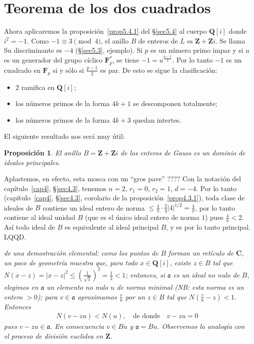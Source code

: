 \documentclass[bibtotoc,leqno,spanish]{amsbook}
\let\emph\relax %
\newcommand{\QQ}{\mathbf{Q}}
\newcommand{\ZZ}{\mathbf{Z}}
\newcommand{\FF}{\mathbf{F}}
\newcommand{\CC}{\mathbf{C}}
\newcommand{\idl}[1]{\mathfrak{#1}}
\newcommand{\QED}{LQQD.}
\newcommand{\abs}[1]{\left\lvert#1\right\rvert}
\numberwithin{equation}{section}
\newenvironment{comm}%
	{\begin{list}{}{\setlength{\leftmargin}{2\parindent}\setlength{\topsep}{\baselineskip}}\item\itshape}
	{\end{list}}
\theoremstyle{note}
\theoremstyle{note}
\newtheorem{proposition}{Proposici\'on}
\theoremstyle{rem}
\numberwithin{theorem}{section}
\numberwithin{proposition}{section}
\numberwithin{definition}{section}
\numberwithin{lemma}{section}
\numberwithin{corollary}{section}
\numberwithin{example}{section}
\numberwithin{footnote}{section}%
\begin{document}
\section{Teorema de los dos cuadrados}\label{sec5.6}

Ahora aplicaremos la proposici\'on~\ref{prop5.4.1} del \S\ref{sec5.4} al cuerpo $\QQ[i]$ donde $i^{2}=-1$. Como $-1\equiv 3\pmod 4$,
el anillo $B$ de enteros de $L$ es $\ZZ+\ZZ i$. Se llama \emph{el anillo de enteros de Gauss.} Su discriminante
es $-4$ (\S\ref{sec5.3}, ejemplo). Si $p$ es un n\'umero primo impar y si $u$ es un generador del grupo c\'iclico
$\FF_{p}^{*}$, se tiene $-1=u^{\frac{p-1}{2}}$. Por lo tanto $-1$ es un cuadrado en $\FF_{p}$ si y s\'olo si
$\frac{p-1}{2}$ es par. De esto se sigue la clasificaci\'on:
\begin{itemize}
\item $2$ ramifica en $\QQ[i]$;
\item los n\'umeros primos de la forma $4k+1$ se descomponen totalmente;
\item los n\'umeros primos de la forma $4k+3$ quedan intertes.
\end{itemize}
El siguiente resultado nos ser\'a muy \'util:

\begin{proposition}\label{prop5.6.1}
El anillo $B = \ZZ+\ZZ i$ de los enteros de Gauss es un dominio de ideales principales.
\end{proposition}

Aplastemos, en efecto, esta mosca con un ``gros pave'' ???? Con la notaci\'on del cap\'itulo~\ref{cap4},
\S\ref{sec4.3}, tenemos $n=2$, $r_{1}=0$, $r_{2}=1$, $d=-4$. Por lo tanto (cap\'itulo~\ref{cap4}, \S\ref{sec4.3},
corolario de la proposici\'on~\ref{prop4.3.1}),
toda clase de ideales de $B$ contiene un ideal entero de norma $\leq\frac{4}{\pi}\cdot\frac{2}{4}
\abs{4}^{1/2}=\frac{4}{\pi}$, por lo tanto contiene al ideal unidad $B$ (que es el \'unico ideal entero de
norma $1$) pues $\frac{4}{\pi}<2$. As\'i todo ideal de $B$ es equivalente al ideal principal $B$, y es por
lo tanto principal. \QED

\begin{comm}
\emph{Sketch???} de una demostraci\'on elemental: como los puntos de $B$ forman un ret\'iculo de $\CC$,
un poco de geometr\'ia muestra que, para todo $x\in\QQ[i]$, existe $z\in B$ tal que
$N(x-z)=\abs{x-z}^{2}\leq\left(\frac{1}{\sqrt{2}}\right)^{2}=\frac{1}{2}< 1$; entonces, si $\idl{a}$ es un
ideal no nulo de $B$, elegimos en $\idl{a}$ un elemento no nulo $u$ de norma minimal (NB: esta norma es un
entero $>0$); para $v\in\idl{a}$ aproximamos $\frac{v}{u}$ por un $z\in B$ tal que $N\left(\frac{v}{u}-z\right)<1$.
Entonces
\begin{gather*}
N(v-zu) < N(u),\quad\text{de donde}\quad v-zu=0
\end{gather*}
pues $v-zu\in\idl{a}$. En consecuencia $v\in Bu$ y $\idl{a}=Bu$. Observemos la analog\'ia con el proceso de
divisi\'on euclidea en $\ZZ$.
\end{comm}
\end{document}
